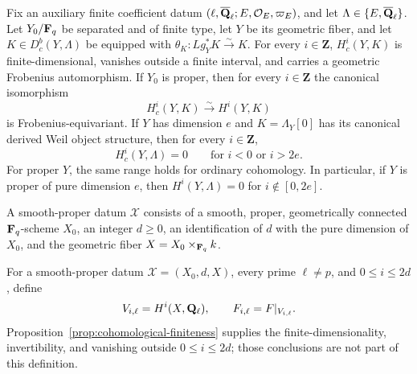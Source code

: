 \begin{proposition}
\label{prop:cohomological-finiteness}


Fix an auxiliary finite coefficient datum
\((\ell,\overline{\mathbf Q}_\ell;E,\mathcal O_E,\varpi_E)\), and let
\(\Lambda\in\{E,\overline{\mathbf Q}_\ell\}\).  Let \(Y_0/\mathbf F_q\) be separated and of finite
type, let \(Y\) be its geometric fiber, and let
\(K\in D^b_c(Y,\Lambda)\) be equipped with
\(\theta_K:Lg_Y^*K\xrightarrow{\sim}K\).  For every \(i\in\mathbf Z\),
\(H_c^i(Y,K)\) is
finite-dimensional, vanishes outside a finite interval,
and carries a geometric Frobenius automorphism.  If \(Y_0\) is proper, then
for every \(i\in\mathbf Z\) the
canonical isomorphism
\[
 H_c^i(Y,K)\xrightarrow{\sim}H^i(Y,K)
\]
is Frobenius-equivariant.
If \(Y\) has dimension \(e\) and \(K=\Lambda_Y[0]\) has its canonical derived
Weil object structure, then for every \(i\in\mathbf Z\),
\[
 H_c^i(Y,\Lambda)=0\qquad\text{for }i<0\text{ or }i>2e.
\]
For proper \(Y\), the same range holds for ordinary cohomology.  In
particular, if \(Y\) is proper of pure dimension \(e\), then
\(H^i(Y,\Lambda)=0\) for \(i\notin[0,2e]\).
\end{proposition}



\begin{definition}
\label{def:smooth-proper-datum}


A smooth-proper datum \(\mathscr X\) consists of a smooth, proper,
geometrically connected \(\mathbf F_q\)-scheme \(X_0\), an integer \(d\geq0\), an
identification of \(d\) with the pure dimension of \(X_0\), and the
geometric fiber \(X=X_0\times_{\mathbf F_q}k\).
\end{definition}


\begin{definition}
\label{def:smooth-proper-cohomological-family}


For a smooth-proper datum \(\mathscr X=(X_0,d,X)\), every prime
\(\ell\neq p\), and
\(0\leq i\leq2d\), define
\[
 V_{i,\ell}=H^i(X,\mathbf Q_{\ell}),\qquad
 F_{i,\ell}=F\vert_{V_{i,\ell}}.
\]
Proposition~\ref{prop:cohomological-finiteness} supplies the
finite-dimensionality, invertibility, and vanishing outside
\(0\leq i\leq2d\); those conclusions are not part of this definition.
\end{definition}

